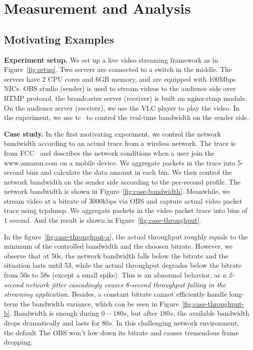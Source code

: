 \section{Measurement and Analysis}

\subsection{Motivating Examples}

\textbf{Experiment setup.} We set up a live video streaming framework as in Figure~\ref{fig:setup}. Two servers are connected to a switch in the middle. The servers have 2 CPU cores and 6GB memory, and are equipped with 100Mbps NICs. OBS studio (sender) is used to stream videos to the audience side over RTMP protocol, the broadcaster server (receiver) is built on nginx-rtmp module. On the audience server (receiver), we use the VLC player to play the video. In the experiment, we use tc~\cite{tc} to control the real-time bandwidth on the sender side.


\textbf{Case study.} In the first motivating experiment, we control the network bandwidth according to an actual trace from a wireless network. The trace is from FCC~\cite{fcc} and describes the network conditions when a user join the www.amazon.com on a mobile device. We aggregate packets in the trace into 5-second bins and calculate the data amount in each bin. We then control the network bandwidth on the sender side according to the per-second profile. The network bandwidth is shown in Figure~\ref{fig:case-bandwidth}. Meanwhile, we stream video at a bitrate of $3000$kbps via OBS and capture actual video packet trace using tcpdump. We aggregate packets in the video packet trace into bins of $1$ second. And the result is shown in Figure~\ref{fig:case-throughput}.

In the figure~\ref{fig:case-throughput-a}, the actual throughput roughly equals to the minimum of the controlled bandwidth and the choosen bitrate. However, we observe that at 50s, the network bandwidth falls below the bitrate and the situation lasts until 53, while the actual throughput degrades below the bitrate from 50s to 58s (except a small spike). This is an abnormal behavior, as \textit{a 2-second network jitter cascadingly causes 8-second throughput falling in the streaming application.} Besides, a constant bitrate cannot efficiently handle long-term the bandwidth variance, which can be seen in Figure~\ref{fig:case-throughput-b}. Bandwidth is enough during $0-180s$, but after $180s$, the available bandwidth drops dramatically and lasts for $80s$. In this challenging network environment, the default The OBS won't low down its bitrate and causes tremendous frame dropping.

